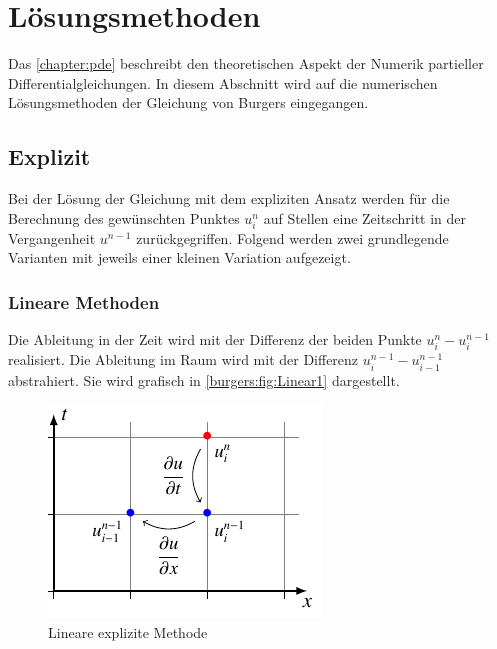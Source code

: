 %
%
\section{Lösungsmethoden
\label{burgers:section:loesung}}

Das \autoref{chapter:pde} beschreibt den theoretischen Aspekt der Numerik  partieller Differentialgleichungen.
In diesem Abschnitt wird auf die numerischen Lösungsmethoden der Gleichung von Burgers eingegangen.


\subsection{Explizit}

Bei der Lösung der Gleichung mit dem expliziten Ansatz werden für die Berechnung des gewünschten Punktes $u_i^n$ auf Stellen eine  Zeitschritt in der Vergangenheit $u^{n-1}$ zurückgegriffen.
Folgend werden zwei grundlegende Varianten mit jeweils einer kleinen Variation aufgezeigt.

\subsubsection{Lineare Methoden}

	Die Ableitung in der Zeit wird mit der Differenz der beiden Punkte $u_{i}^{n}-u_{i}^{n-1}$ realisiert.
	Die Ableitung im Raum wird mit der Differenz $u_{i}^{n-1}-u_{i-1}^{n-1}$ abstrahiert.
	Sie wird grafisch in \autoref{burgers:fig:Linear1} dargestellt.


	     \begin{figure}
		\centering
		\includegraphics[height=.4\textwidth]{papers/burgers/BurgersEquation/tikz/linear1/linear1.pdf}
		\caption{Lineare explizite Methode}
		\label{burgers:fig:Linear1}
		\end{figure}

